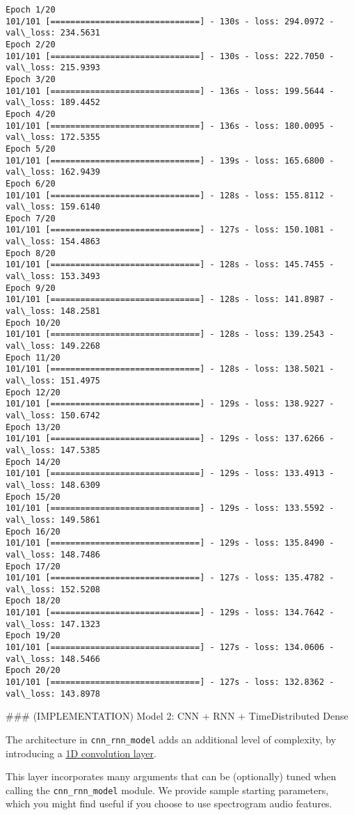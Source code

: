 \documentclass[11pt]{article}
\begin{document}
    \begin{Verbatim}[commandchars=\\\{\}]
Epoch 1/20
101/101 [==============================] - 130s - loss: 294.0972 - val\_loss: 234.5631
Epoch 2/20
101/101 [==============================] - 130s - loss: 222.7050 - val\_loss: 215.9393
Epoch 3/20
101/101 [==============================] - 136s - loss: 199.5644 - val\_loss: 189.4452
Epoch 4/20
101/101 [==============================] - 136s - loss: 180.0095 - val\_loss: 172.5355
Epoch 5/20
101/101 [==============================] - 139s - loss: 165.6800 - val\_loss: 162.9439
Epoch 6/20
101/101 [==============================] - 128s - loss: 155.8112 - val\_loss: 159.6140
Epoch 7/20
101/101 [==============================] - 127s - loss: 150.1081 - val\_loss: 154.4863
Epoch 8/20
101/101 [==============================] - 128s - loss: 145.7455 - val\_loss: 153.3493
Epoch 9/20
101/101 [==============================] - 128s - loss: 141.8987 - val\_loss: 148.2581
Epoch 10/20
101/101 [==============================] - 128s - loss: 139.2543 - val\_loss: 149.2268
Epoch 11/20
101/101 [==============================] - 128s - loss: 138.5021 - val\_loss: 151.4975
Epoch 12/20
101/101 [==============================] - 129s - loss: 138.9227 - val\_loss: 150.6742
Epoch 13/20
101/101 [==============================] - 129s - loss: 137.6266 - val\_loss: 147.5385
Epoch 14/20
101/101 [==============================] - 129s - loss: 133.4913 - val\_loss: 148.6309
Epoch 15/20
101/101 [==============================] - 129s - loss: 133.5592 - val\_loss: 149.5861
Epoch 16/20
101/101 [==============================] - 129s - loss: 135.8490 - val\_loss: 148.7486
Epoch 17/20
101/101 [==============================] - 127s - loss: 135.4782 - val\_loss: 152.5208
Epoch 18/20
101/101 [==============================] - 129s - loss: 134.7642 - val\_loss: 147.1323
Epoch 19/20
101/101 [==============================] - 127s - loss: 134.0606 - val\_loss: 148.5466
Epoch 20/20
101/101 [==============================] - 127s - loss: 132.8362 - val\_loss: 143.8978

    \end{Verbatim}

     \#\#\# (IMPLEMENTATION) Model 2: CNN + RNN + TimeDistributed Dense

The architecture in \texttt{cnn\_rnn\_model} adds an additional level of
complexity, by introducing a
\href{https://keras.io/layers/convolutional/\#conv1d}{1D convolution
layer}.

This layer incorporates many arguments that can be (optionally) tuned
when calling the \texttt{cnn\_rnn\_model} module. We provide sample
starting parameters, which you might find useful if you choose to use
spectrogram audio features.
\end{document}
